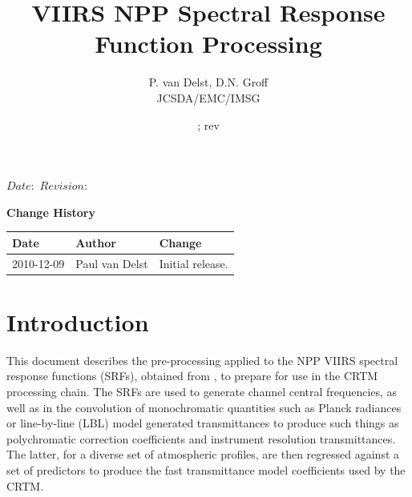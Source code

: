 


%

\SVN $Date: $
\SVN $Revision: $


\title{VIIRS NPP Spectral Response Function Processing}
\author{P. van Delst,
        D.N. Groff\\JCSDA/EMC/IMSG}
\date{\SVNDate ; rev\SVNRevision}
\docnumber{ }



\maketitle

\draftwatermark

\thispagestyle{empty}
\vspace*{10cm}
\begin{center}
  {\sffamily\Large\bfseries Change History}
  \begin{table}[htp]
    \centering
    \begin{tabular}{|p{2cm}|p{3cm}|p{8cm}|}
      \hline
      \sffamily\textbf{Date} & \sffamily\textbf{Author} & \sffamily\textbf{Change}\\
      \hline\hline
      2010-12-09 & Paul van Delst & Initial release.\\
      \hline
    \end{tabular}
  \end{table}
\end{center}
\clearpage
\pagestyle{fancy}
\fancyhead[LE,RO]{\sffamily \rightmark}
\fancyhead[LO,RE]{\sffamily \leftmark}
\setcounter{page}{1}



\section{Introduction}
This document describes the pre-processing applied to the NPP VIIRS spectral response functions (SRFs), obtained from \cite{VIIRS_SRF_Data}, to prepare for use in the CRTM processing chain. The SRFs are used to generate channel central frequencies, as well as in the convolution of monochromatic quantities such as Planck radiances or line-by-line (LBL) model generated transmittances to produce such things as polychromatic correction coefficients and instrument resolution transmittances. The latter, for a diverse set of atmospheric profiles, are then regressed against a set of predictors to produce the fast transmittance model coefficients used by the CRTM.

